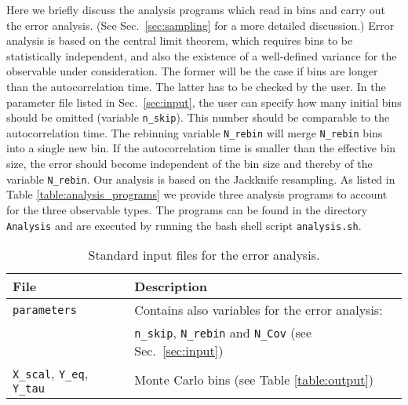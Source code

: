 %
Here we briefly   discuss the analysis programs which read in bins and carry out the error analysis. (See Sec.~\ref{sec:sampling}  for a more detailed discussion.)
Error analysis   is based  on the central limit theorem,  which requires bins to be statistically independent, and also the existence of a well-defined variance  for the observable under consideration. 
The former will be the case if bins are  longer than the autocorrelation time.  The latter has to be checked by the user.  In the parameter file listed in Sec.~\ref{sec:input}, the user  can specify how many initial bins should be omitted (variable \texttt{n\_skip}). 
This  number should be comparable to the autocorrelation time.     
The  rebinning  variable \texttt{N\_rebin} will merge \texttt{N\_rebin}  bins into a single new bin. 
If the autocorrelation time  is smaller than the effective bin size, the error should become independent of the bin size and thereby of the variable \texttt{N\_rebin}.  
Our analysis is based on the Jackknife resampling\cite{efron1981}.
As listed in Table  \ref{table:analysis_programs}  we provide three analysis programs to account for the three observable types. The programs can be found in the directory \texttt{Analysis}  and   are executed by running the  bash shell script 
\texttt{analysis.sh}.
%
\begin{table}[h]
	\begin{tabular}{@{} l l @{}}\toprule
		File & Description \\\midrule
		\texttt{parameters}  &  Contains also variables for the error analysis:\\
		& \texttt{n\_skip}, \texttt{N\_rebin} and \texttt{N\_Cov} (see Sec.~\ref{sec:input}) \\
		\texttt{X\_scal}, \texttt{Y\_eq}, \texttt{Y\_tau} & Monte Carlo bins (see Table \ref{table:output}) \\\bottomrule
	\end{tabular}
	\caption{Standard input files for the error analysis. \label{table:analysis_input}}
\end{table}
%
